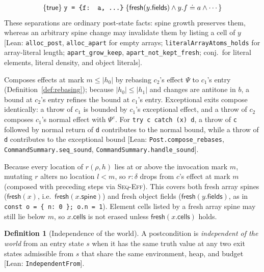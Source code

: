 \documentclass[10pt,a4paper]{article}
\theoremstyle{definition}
\newtheorem{definition}[theorem]{Definition}
\theoremstyle{remark}
\newcommand{\kw}[1]{\mathsf{#1}}
\newcommand{\fresh}{\kw{fresh}}
\newcommand{\len}[1]{|#1|}
\newcommand{\hoare}[3]{\{#1\}\;#2\;\{#3\}}
\newcommand{\code}[1]{\texttt{#1}}
\newcommand{\lean}[1]{\texttt{\small #1}}
\newcommand{\status}[1]{\textsf{\small[#1]}}
\begin{document}
\begin{description}[leftmargin=1.5em,style=nextline]
{\begin{displaymath}
\begin{array}{@{}l@{}}
\hoare{\kw{true}}{\code{y = \{f: a, ...\}}}{\fresh(y.\kw{fields})\wedge y.f\doteq a\wedge\cdots}
\end{array}
\end{displaymath}}
These separations are ordinary post-state facts: spine growth preserves
them, whereas an arbitrary spine change may invalidate them by listing a
cell of $y$
\status{Lean: \lean{alloc\_post}, \lean{alloc\_apart} for empty arrays; \lean{literalArrayAtoms\_holds} for array-literal length; \lean{apart\_grow\_keep}, \lean{apart\_not\_kept\_fresh}; conj.\ for literal elements, literal density, and object literals}.
\item[\textsc{Seq-Eff}] Composes effects at mark $m\le\len{h_0}$ by
rebasing $c_2$'s effect $\Psi$ to $c_1$'s entry
(Definition~\ref{def:rebasing}); because $\len{h_0}\le\len{h_1}$ and
changes are antitone in $b$, a bound at $c_2$'s entry refines the bound at
$c_1$'s entry. Exceptional exits compose identically: a
throw of $c_1$ is bounded by $c_1$'s exceptional effect, and a throw of
$c_2$ composes $c_1$'s normal effect with $\Psi^{e}$. For
\code{try c catch (x) d}, a throw of \code{c} followed by normal return
of \code{d} contributes to the normal bound, while a throw of \code{d}
contributes to the exceptional bound
\status{Lean: \lean{Post.compose\_rebases}, \lean{CommandSummary.seq\_sound}, \lean{CommandSummary.handle\_sound}}.
\item[\textsc{Fresh-Eff}] Because every location of $r(\rho,h)$ lies at or
above the invocation mark $m$, mutating $r$ alters no location $l<m$, so
$r:\delta$ drops from $c$'s effect at mark $m$ (composed with preceding
steps via \textsc{Seq-Eff}). This covers both fresh array spines
($\fresh(x)$, i.e.\ $\fresh(x.\kw{spine})$) and fresh object fields
($\fresh(y.\kw{fields})$, as in \code{const o = \{ n: 0 \}; o.n = 1}).
Element cells listed by a fresh array spine may still lie below $m$, so
$x.\kw{cells}$ is not erased unless $\fresh(x.\kw{cells})$ holds.
\end{description}

\begin{definition}[Independence of the world]\label{def:indep}
A postcondition is \emph{independent of the world} from an entry state
$s$ when it has the same truth value at any two exit states admissible
from $s$ that share the same environment, heap, and budget
\status{Lean: \lean{IndependentFrom}}.
\end{definition}
\end{document}
